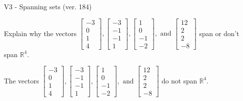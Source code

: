 \begin{exercise}
  \begin{exerciseTitle}V3 - Spanning sets (ver. 184)\end{exerciseTitle}
  \begin{exerciseStatement}
    Explain why the vectors \(\left[\begin{array}{r}
-3 \\
0 \\
1 \\
4
\end{array}\right] , \left[\begin{array}{r}
-3 \\
-1 \\
-1 \\
1
\end{array}\right] , \left[\begin{array}{r}
1 \\
0 \\
-1 \\
-2
\end{array}\right] , \text{ and } \left[\begin{array}{r}
12 \\
2 \\
2 \\
-8
\end{array}\right]\) span or don't span \(\mathbb{R}^4\). 
	


  \end{exerciseStatement}
  \begin{exerciseAnswer}
   The vectors \(\left[\begin{array}{r}
-3 \\
0 \\
1 \\
4
\end{array}\right] , \left[\begin{array}{r}
-3 \\
-1 \\
-1 \\
1
\end{array}\right] , \left[\begin{array}{r}
1 \\
0 \\
-1 \\
-2
\end{array}\right] , \text{ and } \left[\begin{array}{r}
12 \\
2 \\
2 \\
-8
\end{array}\right]\) 
  	 do not  
	span \(\mathbb{R}^4\).
  


  \end{exerciseAnswer}
\end{exercise}